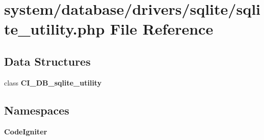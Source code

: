 \section{system/database/drivers/sqlite/sqlite\-\_\-utility.php File Reference}
\label{sqlite__utility_8php}
\subsection*{Data Structures}
\begin{DoxyCompactItemize}
\item 
class {\bf C\-I\-\_\-\-D\-B\-\_\-sqlite\-\_\-utility}
\end{DoxyCompactItemize}
\subsection*{Namespaces}
\begin{DoxyCompactItemize}
\item 
{\bf Code\-Igniter}
\end{DoxyCompactItemize}
